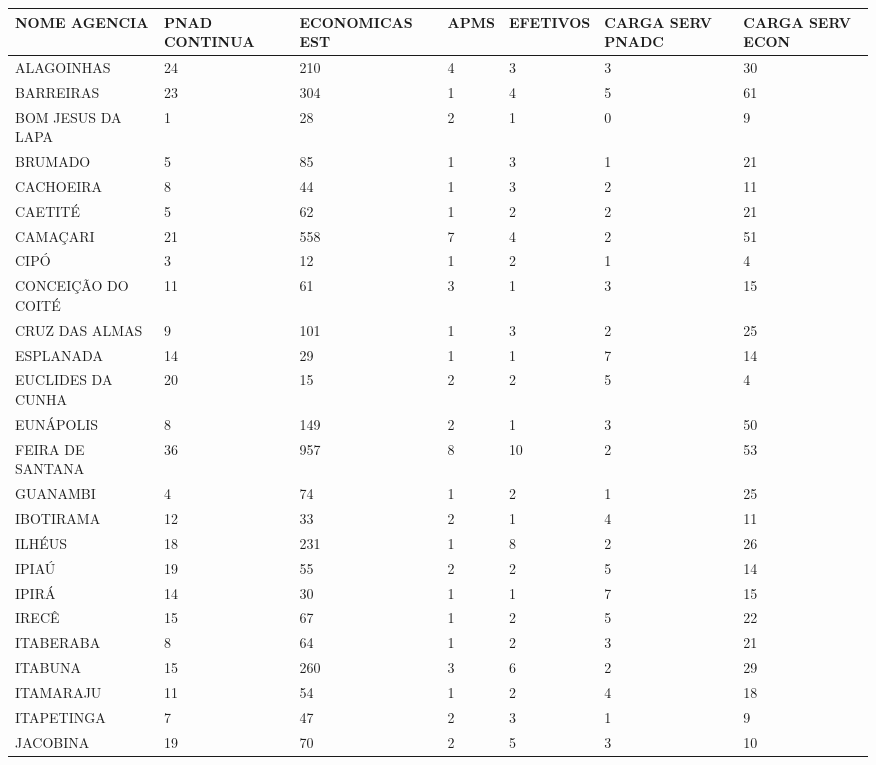 \documentclass[a4paper]{article}
\title{  }
\begin{document}
{\small
\begin{longtable}{|p{2.87cm}|p{1.38cm}|p{1.49cm}|p{1.02cm}|p{1.03cm}|p{1.7cm}|p{1.59cm}|}
  \hline
NOME AGENCIA & PNAD CONTINUA & ECONOMICAS EST & APMS & EFETIVOS & CARGA SERV PNADC & CARGA SERV ECON \\ 
  \hline
ALAGOINHAS & 24 & 210 & 4 & 3 & 3 & 30 \\ 
   \hline
BARREIRAS & 23 & 304 & 1 & 4 & 5 & 61 \\ 
   \hline
BOM JESUS DA LAPA & 1 & 28 & 2 & 1 & 0 & 9 \\ 
   \hline
BRUMADO & 5 & 85 & 1 & 3 & 1 & 21 \\ 
   \hline
CACHOEIRA & 8 & 44 & 1 & 3 & 2 & 11 \\ 
   \hline
CAETITÉ & 5 & 62 & 1 & 2 & 2 & 21 \\ 
   \hline
CAMAÇARI & 21 & 558 & 7 & 4 & 2 & 51 \\ 
   \hline
CIPÓ & 3 & 12 & 1 & 2 & 1 & 4 \\ 
   \hline
CONCEIÇÃO DO COITÉ & 11 & 61 & 3 & 1 & 3 & 15 \\ 
   \hline
CRUZ DAS ALMAS & 9 & 101 & 1 & 3 & 2 & 25 \\ 
   \hline
ESPLANADA & 14 & 29 & 1 & 1 & 7 & 14 \\ 
   \hline
EUCLIDES DA CUNHA & 20 & 15 & 2 & 2 & 5 & 4 \\ 
   \hline
EUNÁPOLIS & 8 & 149 & 2 & 1 & 3 & 50 \\ 
   \hline
FEIRA DE SANTANA & 36 & 957 & 8 & 10 & 2 & 53 \\ 
   \hline
GUANAMBI & 4 & 74 & 1 & 2 & 1 & 25 \\ 
   \hline
IBOTIRAMA & 12 & 33 & 2 & 1 & 4 & 11 \\ 
   \hline
ILHÉUS & 18 & 231 & 1 & 8 & 2 & 26 \\ 
   \hline
IPIAÚ & 19 & 55 & 2 & 2 & 5 & 14 \\ 
   \hline
IPIRÁ & 14 & 30 & 1 & 1 & 7 & 15 \\ 
   \hline
IRECÊ & 15 & 67 & 1 & 2 & 5 & 22 \\ 
   \hline
ITABERABA & 8 & 64 & 1 & 2 & 3 & 21 \\ 
   \hline
ITABUNA & 15 & 260 & 3 & 6 & 2 & 29 \\ 
   \hline
ITAMARAJU & 11 & 54 & 1 & 2 & 4 & 18 \\ 
   \hline
ITAPETINGA & 7 & 47 & 2 & 3 & 1 & 9 \\ 
   \hline
JACOBINA & 19 & 70 & 2 & 5 & 3 & 10 \\ 

\end{longtable}}
\end{document}
